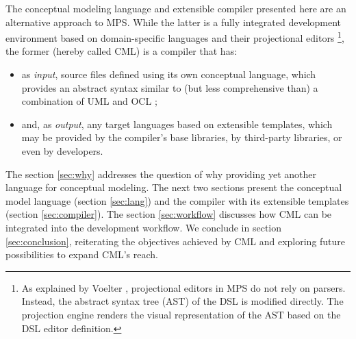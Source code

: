 The conceptual modeling language and extensible compiler presented here are an alternative approach to MPS.
While the latter is a fully integrated development environment based on domain-specific languages and their projectional editors \footnote{As explained by Voelter \cite{voelter}, projectional editors in MPS do not rely on parsers.
Instead, the abstract syntax tree (AST) of the DSL is modified directly.
The projection engine renders the visual representation of the AST based on the DSL editor definition.},
the former (hereby called CML) is a compiler that has:
\begin{itemize}
\item as \emph{input}, source files defined using its own conceptual language,
which provides an abstract syntax similar to (but less comprehensive than) a combination of UML \cite{uml} and OCL \cite{ocl}; 
\item and, as \emph{output}, any target languages based on extensible templates,
which may be provided by the compiler's base libraries, by third-party libraries, or even by developers.
\end{itemize}

The section \ref{sec:why} addresses the question of why providing yet another language for conceptual modeling.
The next two sections present the conceptual model language (section \ref{sec:lang}) and the compiler with its extensible templates (section \ref{sec:compiler}).
The section \ref{sec:workflow} discusses how CML can be integrated into the development workflow.
We conclude in section \ref{sec:conclusion},
reiterating the objectives achieved by CML and exploring future possibilities to expand CML's reach.
